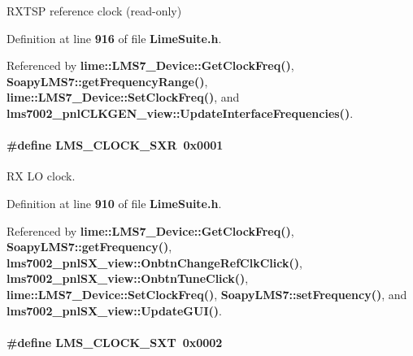 R\+X\+T\+SP reference clock (read-\/only) 



Definition at line {\bf 916} of file {\bf Lime\+Suite.\+h}.



Referenced by {\bf lime\+::\+L\+M\+S7\+\_\+\+Device\+::\+Get\+Clock\+Freq()}, {\bf Soapy\+L\+M\+S7\+::get\+Frequency\+Range()}, {\bf lime\+::\+L\+M\+S7\+\_\+\+Device\+::\+Set\+Clock\+Freq()}, and {\bf lms7002\+\_\+pnl\+C\+L\+K\+G\+E\+N\+\_\+view\+::\+Update\+Interface\+Frequencies()}.

\paragraph[{L\+M\+S\+\_\+\+C\+L\+O\+C\+K\+\_\+\+S\+XR}]{\setlength{\rightskip}{0pt plus 5cm}\#define L\+M\+S\+\_\+\+C\+L\+O\+C\+K\+\_\+\+S\+XR~0x0001}\label{group__LMS__CLOCK__ID_gad6ab0c09df6c5e25e420d19f69497817}


RX LO clock. 



Definition at line {\bf 910} of file {\bf Lime\+Suite.\+h}.



Referenced by {\bf lime\+::\+L\+M\+S7\+\_\+\+Device\+::\+Get\+Clock\+Freq()}, {\bf Soapy\+L\+M\+S7\+::get\+Frequency()}, {\bf lms7002\+\_\+pnl\+S\+X\+\_\+view\+::\+Onbtn\+Change\+Ref\+Clk\+Click()}, {\bf lms7002\+\_\+pnl\+S\+X\+\_\+view\+::\+Onbtn\+Tune\+Click()}, {\bf lime\+::\+L\+M\+S7\+\_\+\+Device\+::\+Set\+Clock\+Freq()}, {\bf Soapy\+L\+M\+S7\+::set\+Frequency()}, and {\bf lms7002\+\_\+pnl\+S\+X\+\_\+view\+::\+Update\+G\+U\+I()}.

\paragraph[{L\+M\+S\+\_\+\+C\+L\+O\+C\+K\+\_\+\+S\+XT}]{\setlength{\rightskip}{0pt plus 5cm}\#define L\+M\+S\+\_\+\+C\+L\+O\+C\+K\+\_\+\+S\+XT~0x0002}\label{group__LMS__CLOCK__ID_gad8512e8c6346b2da2cdc68914c421b44}



